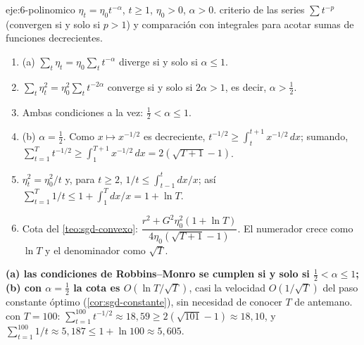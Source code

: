 \begin{solucion}{eje:6-polinomico}
\datos $\eta_t=\eta_0t^{-\alpha}$, $t\ge 1$, $\eta_0>0$, $\alpha>0$.
\planteamiento criterio de las series $\sum t^{-p}$ (convergen si y solo si $p>1$) y comparación con integrales para acotar sumas de funciones decrecientes.
\pasos
\begin{enumerate}[label=\arabic*.]
  \item (a) $\sum_t\eta_t=\eta_0\sum_tt^{-\alpha}$ diverge si y solo si $\alpha\le 1$.
  \item $\sum_t\eta_t^{2}=\eta_0^{2}\sum_tt^{-2\alpha}$ converge si y solo si $2\alpha>1$, es decir, $\alpha>\frac12$.
  \item Ambas condiciones a la vez: $\frac12<\alpha\le 1$.
  \item (b) $\alpha=\frac12$. Como $x\mapsto x^{-1/2}$ es decreciente, $t^{-1/2}\ge\int_t^{t+1}x^{-1/2}\,dx$; sumando, $\sum_{t=1}^{T}t^{-1/2}\ge\int_1^{T+1}x^{-1/2}\,dx=2(\sqrt{T+1}-1)$.
  \item $\eta_t^{2}=\eta_0^{2}/t$ y, para $t\ge 2$, $1/t\le\int_{t-1}^{t}dx/x$; así $\sum_{t=1}^{T}1/t\le 1+\int_1^{T}dx/x=1+\ln T$.
  \item Cota del \cref{teo:sgd-convexo}: $\dfrac{r^{2}+G^{2}\eta_0^{2}(1+\ln T)}{4\eta_0(\sqrt{T+1}-1)}$. El numerador crece como $\ln T$ y el denominador como $\sqrt T$.
\end{enumerate}
\resultado \textbf{(a) las condiciones de Robbins--Monro se cumplen si y solo si $\frac12<\alpha\le 1$; (b) con $\alpha=\frac12$ la cota es $O(\ln T/\sqrt T)$}, casi la velocidad $O(1/\sqrt T)$ del paso constante óptimo (\cref{cor:sgd-constante}), sin necesidad de conocer $T$ de antemano.
\comprobacion con $T=100$: $\sum_{t=1}^{100}t^{-1/2}\approx 18{,}59\ge 2(\sqrt{101}-1)\approx 18{,}10$, y $\sum_{t=1}^{100}1/t\approx 5{,}187\le 1+\ln 100\approx 5{,}605$.
\end{solucion}
